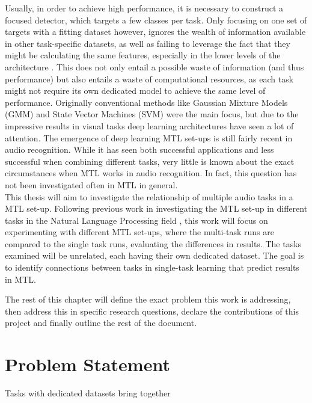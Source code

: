 Usually, in order to achieve high performance, it is necessary to construct a focused detector, which targets a few classes per task. Only focusing on one set of targets with a fitting dataset however, ignores the wealth of information available in other task-specific datasets, as well as failing to leverage the fact that they might be calculating the same features, especially in the lower levels of the architecture \citep{tagliasacchi2020multi}. This does not only entail a possible waste of information (and thus performance) but also entails a waste of computational resources, as each task might not require its own dedicated model to achieve the same level of performance. Originally conventional methods like Gaussian Mixture Models (GMM) and State Vector Machines (SVM) were the main focus, but due to the impressive results in visual tasks deep learning architectures have seen a lot of attention.  The emergence of deep learning MTL set-ups is still fairly recent in audio recognition. While it has seen both successful \citep{tonami2019joint} applications and less successful \citep{sakti2016deep} when combining different tasks, very little is known about the exact circumstances when MTL works in audio recognition. In fact, this question has not been investigated often in MTL in general.\\ 

This thesis will aim to investigate the relationship of multiple audio tasks in a MTL set-up. Following previous work in investigating the MTL set-up in different tasks in the Natural Language Processing field \citep{alonso2016multitask} \citep{bingel2017identifying}, 
this work will focus on experimenting with different MTL set-ups, where the multi-task runs are compared to the single task runs, evaluating the differences in results. The tasks examined will be unrelated, each having their own dedicated dataset. The goal is to identify connections between tasks in single-task learning that predict results in MTL. 

The rest of this chapter will define the exact problem this work is addressing, then address this in specific research questions, declare the contributions of this project and finally outline the rest of the document. 

\section{Problem Statement}

Tasks with dedicated datasets bring together

